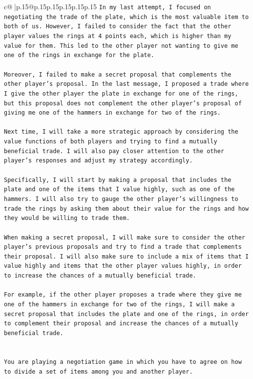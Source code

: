 \documentclass{article}
\begin{document}
{\begin{supertabular}{c@{$\;$}|p{.15\linewidth}@{}p{.15\linewidth}p{.15\linewidth}p{.15\linewidth}p{.15\linewidth}p{.15\linewidth}}
{{{\texttt{In my last attempt, I focused on negotiating the trade of the plate, which is the most valuable item to both of us. However, I failed to consider the fact that the other player values the rings at 4 points each, which is higher than my value for them. This led to the other player not wanting to give me one of the rings in exchange for the plate.} \\
\\ 
\texttt{Moreover, I failed to make a secret proposal that complements the other player's proposal. In the last message, I proposed a trade where I give the other player the plate in exchange for one of the rings, but this proposal does not complement the other player's proposal of giving me one of the hammers in exchange for two of the rings.} \\
\\ 
\texttt{Next time, I will take a more strategic approach by considering the value functions of both players and trying to find a mutually beneficial trade. I will also pay closer attention to the other player's responses and adjust my strategy accordingly.} \\
\\ 
\texttt{Specifically, I will start by making a proposal that includes the plate and one of the items that I value highly, such as one of the hammers. I will also try to gauge the other player's willingness to trade the rings by asking them about their value for the rings and how they would be willing to trade them.} \\
\\ 
\texttt{When making a secret proposal, I will make sure to consider the other player's previous proposals and try to find a trade that complements their proposal. I will also make sure to include a mix of items that I value highly and items that the other player values highly, in order to increase the chances of a mutually beneficial trade.} \\
\\ 
\texttt{For example, if the other player proposes a trade where they give me one of the hammers in exchange for two of the rings, I will make a secret proposal that includes the plate and one of the rings, in order to complement their proposal and increase the chances of a mutually beneficial trade.} \\
\\ 
\\ 
\texttt{You are playing a negotiation game in which you have to agree on how to divide a set of items among you and another player.} \\
}}}
\end{supertabular}}
\end{document}
